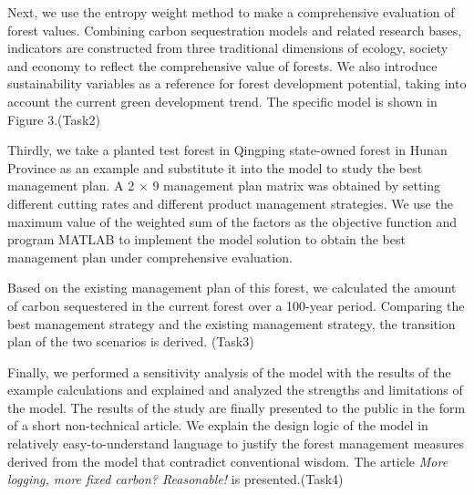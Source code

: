 Next, we use the entropy weight method to make a comprehensive evaluation of forest values. Combining carbon sequestration models and related research bases, indicators are constructed from three traditional dimensions of ecology, society and economy to reflect the comprehensive value of forests. We also introduce sustainability variables as a reference for forest development potential, taking into account the current green development trend.
The specific model is shown in Figure 3.(Task2)

Thirdly, we take a planted test forest in Qingping state-owned forest in Hunan Province as an example and substitute it into the model to study the best management plan. A 2 × 9 management plan matrix was obtained by setting different cutting rates and different product management strategies. We use the maximum value of the weighted sum of the factors as the objective function and program MATLAB to implement the model solution to obtain the best management plan under comprehensive evaluation.

Based on the existing management plan of this forest, we calculated the amount of carbon sequestered in the current forest over a 100-year period. Comparing the best management strategy and the existing management strategy, the transition plan of the two scenarios is derived. (Task3)

Finally, we performed a sensitivity analysis of the model with the results of the example calculations and explained and analyzed the strengths and limitations of the model. The results of the study are finally presented to the public in the form of a short non-technical article. We explain the design logic of the model in relatively easy-to-understand language to justify the forest management measures derived from the model that contradict conventional wisdom. The article \emph {More logging, more fixed carbon? Reasonable!} is presented.(Task4)


